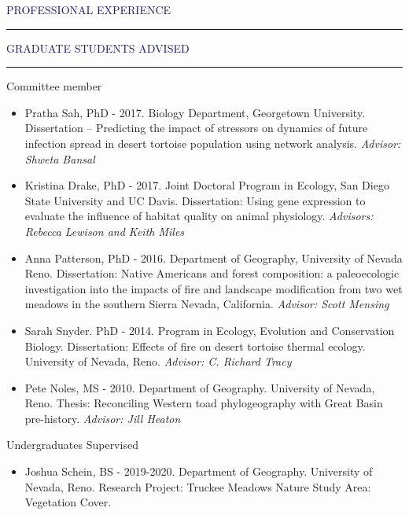 \documentclass{resume} %
\renewenvironment{rSection}[1]{
\sectionskip
\textcolor{MidnightBlue}{\MakeUppercase{#1}}
\sectionlineskip
\hrule
\begin{list}{}{
\setlength{\leftmargin}{1.5em}
}
\item[]
}{
\end{list}
}
\begin{document}
\begin{rSection}{Professional Experience}
\begin{rSection}{Graduate Students Advised}
\begin{rSubsection}{Committee member}{}{}{}
\begin{itemize}
\item Pratha Sah, PhD - 2017. Biology Department, Georgetown University. Dissertation – Predicting the impact of stressors on dynamics of future infection spread in desert tortoise population using network analysis. \textit{Advisor: Shweta Bansal}
\item Kristina Drake, PhD - 2017. Joint Doctoral Program in Ecology, San Diego State University and UC Davis. Dissertation: Using gene expression to evaluate the influence of habitat quality on animal physiology. \textit{Advisors: Rebecca Lewison and Keith Miles}
\item Anna Patterson, PhD - 2016. Department of Geography, University of Nevada Reno. Dissertation: Native Americans and forest composition: a paleoecologic investigation into the impacts of fire and landscape modification from two wet meadows in the southern Sierra Nevada, California. \textit{ Advisor: Scott Mensing}
\item Sarah Snyder. PhD - 2014. Program in Ecology, Evolution and Conservation Biology. Dissertation: Effects of fire on desert tortoise thermal ecology. University of Nevada, Reno. \textit{ Advisor: C. Richard Tracy}
\item Pete Noles, MS - 2010. Department of Geography. University of Nevada, Reno. Thesis: Reconciling Western toad phylogeography with Great Basin pre-history. \textit{Advisor: Jill Heaton}
\end{itemize}
\end{rSubsection}

\begin{rSubSection}{Undergraduates Supervised}
\begin{itemize}
\item Joshua Schein, BS - 2019-2020. Department of Geography. University of Nevada, Reno. Research Project: Truckee Meadows Nature Study Area: Vegetation Cover.


\end{itemize}
\end{rSubSection}
\end{rSection}
\end{rSection}
\end{document}
